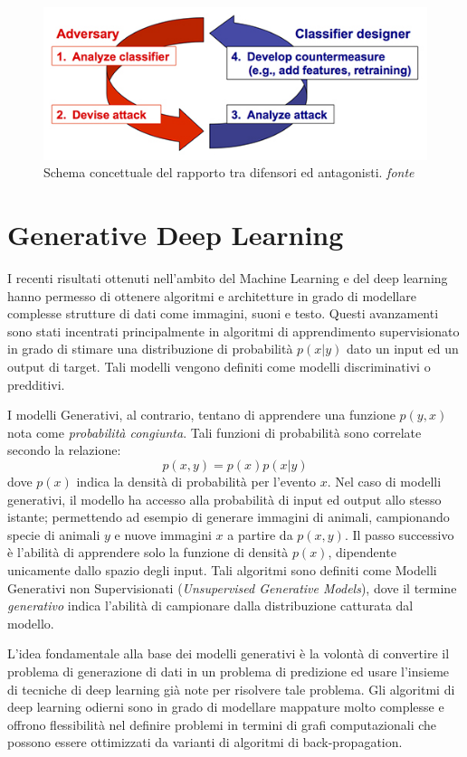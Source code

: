 \begin{figure}[!bp]
	\centering
	\includegraphics[width=\columnwidth]{figures/Reactive_arms_race.jpg}
	\caption{Schema concettuale del rapporto tra difensori ed antagonisti. \textit{fonte}%
	~\cite{wiki:Adversarial_machine_learning} \label{fig:advarms} }
\end{figure}

\newpage
\section{Generative Deep Learning}
\label{sec:gan}
I recenti risultati ottenuti nell'ambito del Machine Learning e del deep learning hanno permesso di ottenere algoritmi e architetture in grado di modellare complesse strutture di dati come immagini, suoni e testo. Questi avanzamenti sono stati incentrati principalmente in algoritmi di apprendimento supervisionato in grado di stimare una distribuzione di probabilità $p(x|y)$ dato un input ed un output di target. Tali modelli vengono definiti come modelli discriminativi o predditivi.

I modelli Generativi, al contrario, tentano di apprendere una funzione $p(y,x)$ nota come \textit{probabilità congiunta}. Tali funzioni di probabilità sono correlate secondo la relazione: 
\[p(x,y)=p(x)p(x|y)\]
dove $p(x)$ indica la densità di probabilità per l'evento $x$. 
Nel caso di modelli generativi, il modello ha accesso alla probabilità di input ed output allo stesso istante; permettendo ad esempio di generare immagini di animali, campionando specie di animali $y$ e nuove immagini $x$ a partire da $p(x,y)$.
Il passo successivo è l'abilità di apprendere solo la funzione di densità $p(x)$, dipendente unicamente dallo spazio degli input. Tali algoritmi sono definiti come Modelli Generativi non Supervisionati (\textit{Unsupervised Generative Models}), dove il termine \textit{generativo} indica l'abilità di campionare dalla distribuzione catturata dal modello. 

L'idea fondamentale alla base dei modelli generativi è la volontà di convertire il problema di generazione di dati in un problema di predizione ed usare l'insieme di tecniche di deep learning già note per risolvere tale problema. Gli algoritmi di deep learning odierni sono in grado di modellare mappature molto complesse e offrono flessibilità nel definire problemi in termini di grafi computazionali che possono essere ottimizzati da varianti di algoritmi di back-propagation.

